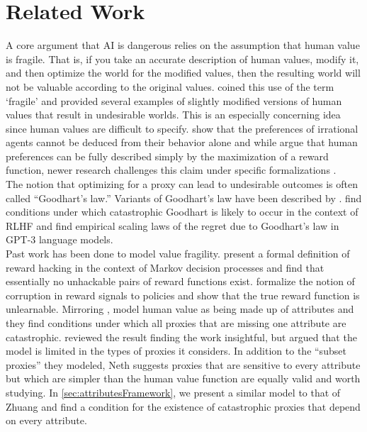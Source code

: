 \documentclass{article}
\begin{document}
\section{Related Work} \label{sec:relatedWork}
A core argument that AI is dangerous relies on the assumption that human value is fragile. That is, if you take an accurate description of human values, modify it, and then optimize the world for the modified values, then the resulting world will not be valuable according to the original values. \citet{yudkowsky2009value} coined this use of the term ‘fragile’ and provided several examples of slightly modified versions of human values that result in undesirable worlds. This is an especially concerning idea since human values are difficult to specify. \citet{armstrong2018occam} show that the preferences of irrational agents cannot be deduced from their behavior alone and while \citet{silver2021reward} argue that human preferences can be fully described simply by the maximization of a reward function, newer research challenges this claim under specific formalizations \citep{skalse2023reward, pitis2023consistent}.\\

The notion that optimizing for a proxy can lead to undesirable outcomes is often called ``Goodhart's law.'' Variants of Goodhart's law have been described by \citet{manheim2018categorizing}. \citet{kwa2024catastrophic} find conditions under which catastrophic Goodhart is likely to occur in the context of RLHF and \citet{gao2023scaling} find empirical scaling laws of the regret due to Goodhart's law in GPT-3 language models.\\

Past work has been done to model value fragility. \citet{skalse2022defining} present a formal definition of reward hacking in the context of Markov decision processes and find that essentially no unhackable pairs of reward functions exist. \citet{everitt2017reinforcement} formalize the notion of corruption in reward signals to policies and show that the true reward function is unlearnable. Mirroring \citet{yudkowsky2009value}, \citet{zhuang2020consequences} model human value as being made up of attributes and they find conditions under which all proxies that are missing one attribute are catastrophic. \citet{neth2026against} reviewed the result finding the work insightful, but argued that the model is limited in the types of proxies it considers. In addition to the ``subset proxies'' they modeled, Neth suggests proxies that are sensitive to every attribute but which are simpler than the human value function are equally valid and worth studying. In \cref{sec:attributesFramework}, we present a similar model to that of Zhuang and find a condition for the existence of catastrophic proxies that depend on every attribute.\\
\end{document}
